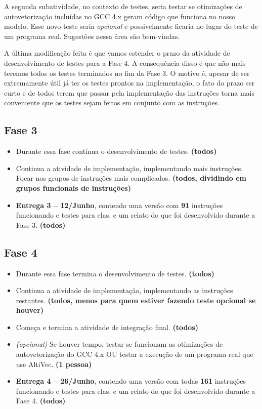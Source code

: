 \documentclass[twocolumn]{article}
\newcommand{\who}[1]{\textbf{ (#1)}}
\begin{document}
A segunda subatividade, no contexto de testes, seria testar se otimizações de
autovetorização incluídas no GCC 4.x geram código que funciona no nosso modelo.
Esse novo teste seria \emph{opcional} e possivelmente ficaria no lugar do teste
de um programa real. Sugestões nessa área são bem-vindas.

A última modificação feita é que vamos estender o prazo da atividade de
desenvolvimento de testes para a Fase 4. A consequência disso é que não mais
teremos todos os testes terminados no fim da Fase 3. O motivo é, apesar de ser
extremamente útil já ter os testes prontos na implementação, o fato do prazo
ser curto e de todos terem que passar pela implementação das instruções torna
mais conveniente que os testes sejam feitos em conjunto com as instruções.

\subsection{Fase 3}

\begin{itemize}

\item Durante essa fase continua o desenvolvimento de testes. \who{todos}

\item Continua a atividade de implementação, implementando mais instruções.
Focar nos grupos de instruções mais complicados. \who{todos, dividindo
em grupos funcionais de instruções}

\item \textbf{Entrega 3 -- 12/Junho}, contendo uma versão com \textbf{91}
instruções funcionando e testes para elas, e um relato do que foi desenvolvido
durante a Fase 3.\who{todos}

\end{itemize}


\subsection{Fase 4}

\begin{itemize}

\item Durante essa fase termina o desenvolvimento de testes. \who{todos}

\item Continua a atividade de implementação, implementando as instruções
restantes. \who{todos, menos para quem estiver fazendo teste opcional se
houver}

\item Começa e termina a atividade de integração final. \who{todos}

\item \emph{(opcional)} Se houver tempo, testar se funcionam as otimizações de
autovetorização do GCC 4.x OU testar a execução de um programa real que use
AltiVec. \who{1 pessoa}

\item \textbf{Entrega 4 -- 26/Junho}, contendo uma versão com todas
\textbf{161} instruções funcionando e testes para elas, e um relato do que foi
desenvolvido durante a Fase 4. \who{todos}

\end{itemize}
\end{document}
